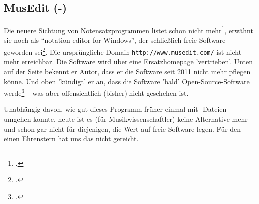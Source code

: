 %
%
%

\subsection{MusEdit (-)}

\label{MusEdit}Die neuere Sichtung von Notensatzprogrammen listet 
schon nicht mehr\footcite[vgl.][\nopage wp.]{WpedNotensatz2019a}, 
erwähnt sie noch als \enquote{notation editor for Windows}, der schließlich
freie Software geworden sei\footcite[vgl.][\nopage wp.]{MusicXML2018b}. Die
ursprüngliche Domain \texttt{http://www.musedit.com/} ist nicht mehr erreichbar.
Die Software wird über eine Ersatzhomepage 'vertrieben'. Unten auf der Seite
bekennt er Autor, dass er die Software seit 2011 nicht mehr pflegen könne. Und
oben 'kündigt' er an, dass die Software 'bald' Open-Source-Software
werde\footcite[vgl.][\nopage wp.]{Rogers2011a} -- was aber offensichtlich
(bisher) nicht geschehen ist.

Unabhängig davon, wie gut dieses Programm früher einmal mit
-Dateien umgehen konnte, heute ist es (für Musikwissenschaftler)
keine Alternative mehr -- und schon gar nicht für diejenigen, die Wert auf freie
Software legen. Für den einen Ehrenstern hat uns das nicht gereicht.

%
